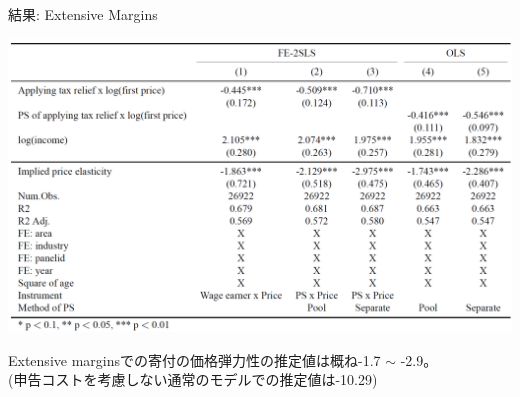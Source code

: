 \documentclass[dvipdfmx,10pt]{beamer}
\begin{document}
\begin{frame}{結果: Extensive Margins}
	\begin{table}
		\centering
		\includegraphics[width=0.9\linewidth]{Tab_res_2}
		\caption{First-Price Elasticities (Extensive Margins)}
		\label{tab:3}
	\end{table}
	Extensive marginsでの寄付の価格弾力性の推定値は概ね-1.7 $\sim$ -2.9。\\
	(申告コストを考慮しない通常のモデルでの推定値は-10.29)
\end{frame}
\end{document}
